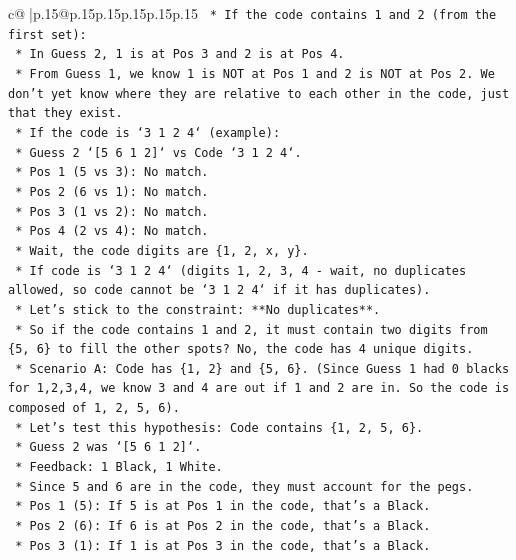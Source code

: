\documentclass{article}
\begin{document}
{\begin{supertabular}{c@{$\;$}|p{.15\linewidth}@{}p{.15\linewidth}p{.15\linewidth}p{.15\linewidth}p{.15\linewidth}p{.15\linewidth}}
{{{\texttt{    *   If the code contains 1 and 2 (from the first set):} \\
\texttt{        *   In Guess 2, 1 is at Pos 3 and 2 is at Pos 4.} \\
\texttt{        *   From Guess 1, we know 1 is NOT at Pos 1 and 2 is NOT at Pos 2. We don't yet know where they are relative to each other in the code, just that they exist.} \\
\texttt{        *   If the code is `3 1 2 4` (example):} \\
\texttt{            *   Guess 2 `{[}5 6 1 2{]}` vs Code `3 1 2 4`.} \\
\texttt{            *   Pos 1 (5 vs 3): No match.} \\
\texttt{            *   Pos 2 (6 vs 1): No match.} \\
\texttt{            *   Pos 3 (1 vs 2): No match.} \\
\texttt{            *   Pos 4 (2 vs 4): No match.} \\
\texttt{            *   Wait, the code digits are \{1, 2, x, y\}.} \\
\texttt{            *   If code is `3 1 2 4` (digits 1, 2, 3, 4 {-} wait, no duplicates allowed, so code cannot be `3 1 2 4` if it has duplicates).} \\
\texttt{            *   Let's stick to the constraint: **No duplicates**.} \\
\texttt{            *   So if the code contains 1 and 2, it must contain two digits from \{5, 6\} to fill the other spots? No, the code has 4 unique digits.} \\
\texttt{            *   Scenario A: Code has \{1, 2\} and \{5, 6\}. (Since Guess 1 had 0 blacks for 1,2,3,4, we know 3 and 4 are out if 1 and 2 are in. So the code is composed of 1, 2, 5, 6).} \\
\texttt{            *   Let's test this hypothesis: Code contains \{1, 2, 5, 6\}.} \\
\texttt{            *   Guess 2 was `{[}5 6 1 2{]}`.} \\
\texttt{            *   Feedback: 1 Black, 1 White.} \\
\texttt{            *   Since 5 and 6 are in the code, they must account for the pegs.} \\
\texttt{            *   Pos 1 (5): If 5 is at Pos 1 in the code, that's a Black.} \\
\texttt{            *   Pos 2 (6): If 6 is at Pos 2 in the code, that's a Black.} \\
\texttt{            *   Pos 3 (1): If 1 is at Pos 3 in the code, that's a Black.} \\
}}}
\end{supertabular}}
\end{document}
